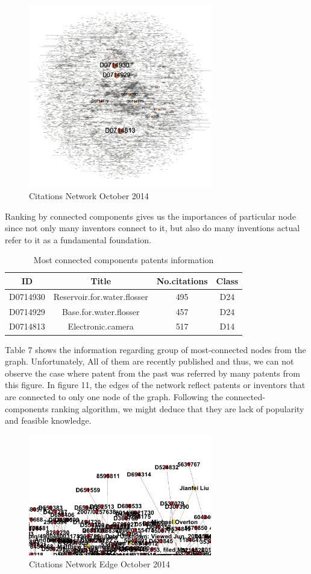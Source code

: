 \documentclass{sig-alternate}
\begin{document}
{\begin{figure}[htp]
\centering
\includegraphics[width=80mm]{citation-label.png}
\caption{ Citations Network October 2014 }
\end{figure}
Ranking by connected components gives us the importances of particular node since not only many inventors connect to it, but also do many inventions actual refer to it as a fundamental foundation.  
\begin{table}[]
\begin{tabular}{|c|c|c|c|}  \hline
 ID&Title&No.citations&Class\\ \hline
 D0714930&Reservoir.for.water.flosser&495&D24\\ \hline
D0714929&Base.for.water.flosser&457 &D24\\ \hline
D0714813&Electronic.camera&517&D14 \\ \hline
\end{tabular}
\caption{Most connected components patents information}
\end{table}
Table 7 shows the information regarding group of most-connected nodes from the graph. Unfortunately, All of them are recently published and thus, we can not observe the case where patent from the past was referred by many patents from this figure.
In figure 11, the edges of the network reflect patents or inventors that are connected to only one node of the graph. Following the connected-components ranking algorithm, we might deduce that they are lack of popularity and feasible knowledge.
 \begin{figure}[!htb]
\centering
\includegraphics[width=80mm]{endcitation.png}
\caption{ Citations Network Edge October 2014 }
\end{figure}



}
\end{document}
